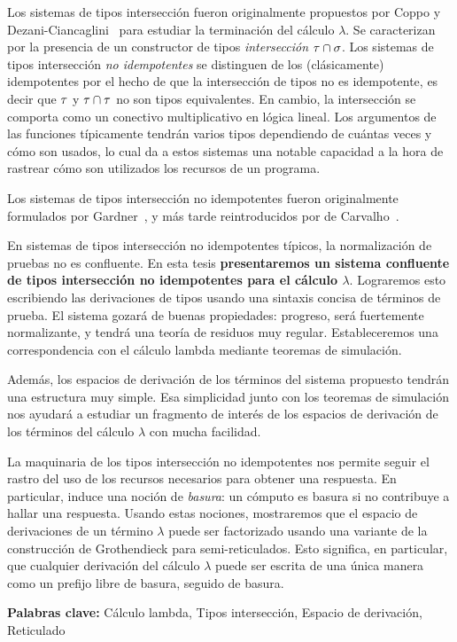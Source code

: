 Los sistemas de tipos intersección fueron originalmente propuestos por
Coppo y Dezani-Ciancaglini~\cite{DBLP:journals/aml/CoppoD78}
para estudiar la terminación del cálculo $\lambda$.
Se caracterizan por la presencia de un constructor de tipos \textit{intersección} $\tau \cap \sigma$.
Los sistemas de tipos intersección \textit{no idempotentes} se distinguen de los (clásicamente) idempotentes
por el hecho de que la intersección de tipos no es idempotente, es decir que $\tau$ y $\tau \cap \tau$
no son tipos equivalentes.
En cambio, la intersección se comporta como un conectivo multiplicativo en lógica lineal.
Los argumentos de las funciones típicamente tendrán varios tipos dependiendo de cuántas veces y cómo son usados,
lo cual da a estos sistemas una notable capacidad a la hora de rastrear cómo son utilizados los recursos
de un programa.

Los sistemas de tipos intersección no idempotentes fueron originalmente formulados por
Gardner~\cite{gardner1994discovering},
y más tarde reintroducidos por de Carvalho~\cite{carvalho2007semantiques}.

\vspace{1cm}

En sistemas de tipos intersección no idempotentes típicos, la normalización de pruebas no es confluente.
En esta tesis
\textbf{presentaremos un sistema confluente de tipos intersección no idempotentes para el cálculo $\lambda$}.
Lograremos esto escribiendo las derivaciones de tipos usando una sintaxis concisa de términos de prueba.
El sistema gozará de buenas propiedades: progreso, será fuertemente normalizante, y tendrá una teoría de
residuos muy regular.
Estableceremos una correspondencia con el cálculo lambda mediante teoremas de simulación.


Además, los espacios de derivación de los términos del sistema propuesto tendrán una estructura muy simple.
Esa simplicidad junto con los teoremas de simulación nos ayudará a estudiar un fragmento de interés
de los espacios de derivación de los términos del cálculo $\lambda$ con mucha facilidad.

La maquinaria de los tipos intersección no idempotentes nos permite seguir el rastro del uso de los recursos
necesarios para obtener una respuesta.
En particular, induce una noción de \textit{basura}: un cómputo es basura si no contribuye a hallar una respuesta.
Usando estas nociones, mostraremos que el espacio de derivaciones de un término $\lambda$ puede ser factorizado
usando una variante de la construcción de Grothendieck para semi-reticulados.
Esto significa, en particular, que cualquier derivación del cálculo $\lambda$ puede ser escrita
de una única manera como un prefijo libre de basura, seguido de basura.

\vspace{0.5cm}
\noindent
\textbf{Palabras clave:} Cálculo lambda, Tipos intersección, Espacio de derivación, Reticulado
